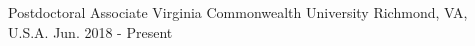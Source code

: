 
\begin{cventries}

  \cventry
    {Postdoctoral Associate} %
    {Virginia Commonwealth University} %
    {Richmond, VA, U.S.A.} %
    {Jun. 2018 - Present} %
    {
}
\end{cventries}
